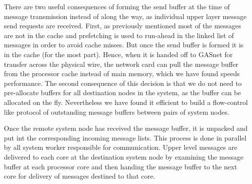 There are two useful consequences of forming the send buffer at the time of
message transmission instead of along the way, as individual upper layer
message send requests are received. First, as previously mentioned most of the
messages are not in the cache and prefetching is used to run-ahead in the
linked list of messages in order to avoid cache misses. But once the send
buffer is formed it is in the cache (for the most part). Hence, when it is
handed off to GASnet for transfer across the physical wire, the network card
can pull the message buffer from the processor cache instead of main memory,
which we have found speeds performance. The second consequence of this
decision is that we do not need to pre-allocate buffers for all destination
nodes in the system, as the buffer can be allocated on the fly. Nevertheless
we have found it efficient to build a flow-control like protocol of
outstanding message buffers between pairs of system nodes.

Once the remote system node has received the message buffer, it is unpacked
and put int the corresponding incoming message lists. This process is done in
parallel by all system worker responsible for communication. Upper level
\Grappa messages are delivered to each core at the destination system node by
examining the message buffer at each processor core and then handing the
message buffer to the next core for delivery of messages destined to that
core.






